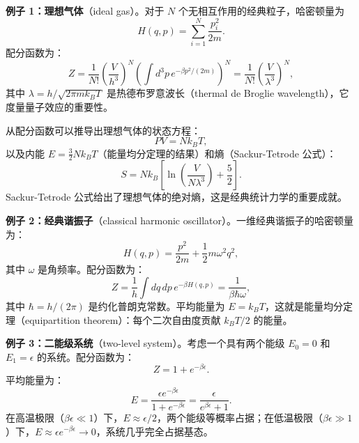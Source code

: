 \begin{example}[理想气体]
\textbf{例子 1：理想气体}（ideal gas）。对于 $N$ 个无相互作用的经典粒子，哈密顿量为
\begin{equation}
    H(q, p) = \sum_{i=1}^{N} \frac{p_i^2}{2m}.
\end{equation}
配分函数为：
\begin{equation}
    Z = \frac{1}{N!} \left(\frac{V}{h^3}\right)^N \left(\int d^3 p \, e^{-\beta p^2/(2m)}\right)^N = \frac{1}{N!} \left(\frac{V}{\lambda^3}\right)^N,
\end{equation}
其中 $\lambda = h/\sqrt{2\pi m k_B T}$ 是热德布罗意波长（thermal de Broglie wavelength），它度量量子效应的重要性。

从配分函数可以推导出理想气体的状态方程：
\begin{equation}
    PV = Nk_B T,
\end{equation}
以及内能 $E = \frac{3}{2}Nk_B T$（能量均分定理的结果）和熵（Sackur-Tetrode 公式）：
\begin{equation}
    S = Nk_B \left[ \ln\left(\frac{V}{N\lambda^3}\right) + \frac{5}{2} \right].
\end{equation}
Sackur-Tetrode 公式给出了理想气体的绝对熵，这是经典统计力学的重要成就。
\end{example}

\begin{example}[经典谐振子]
\textbf{例子 2：经典谐振子}（classical harmonic oscillator）。一维经典谐振子的哈密顿量为：
\begin{equation}
    H(q, p) = \frac{p^2}{2m} + \frac{1}{2}m\omega^2 q^2,
\end{equation}
其中 $\omega$ 是角频率。配分函数为：
\begin{equation}
    Z = \frac{1}{h} \int dq \, dp \, e^{-\beta H(q, p)} = \frac{1}{\beta \hbar \omega},
\end{equation}
其中 $\hbar = h/(2\pi)$ 是约化普朗克常数。平均能量为 $E = k_B T$，这就是能量均分定理（equipartition theorem）：每个二次自由度贡献 $k_B T/2$ 的能量。
\end{example}

\begin{example}[二能级系统]
\textbf{例子 3：二能级系统}（two-level system）。考虑一个具有两个能级 $E_0 = 0$ 和 $E_1 = \epsilon$ 的系统。配分函数为：
\begin{equation}
    Z = 1 + e^{-\beta \epsilon}.
\end{equation}
平均能量为：
\begin{equation}
    E = \frac{\epsilon e^{-\beta \epsilon}}{1 + e^{-\beta \epsilon}} = \frac{\epsilon}{e^{\beta \epsilon} + 1}.
\end{equation}
在高温极限（$\beta \epsilon \ll 1$）下，$E \approx \epsilon/2$，两个能级等概率占据；在低温极限（$\beta \epsilon \gg 1$）下，$E \approx \epsilon e^{-\beta \epsilon} \to 0$，系统几乎完全占据基态。
\end{example}

